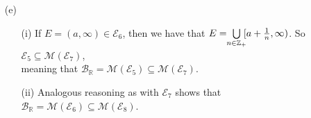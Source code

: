 \documentclass{book}
\newenvironment{myIndent}{%
   \begin{adjustwidth}{2.5em}{0em}%
}{%
   \end{adjustwidth}%
}
\newcommand{\retTwo}{\hfill\bigbreak}
\begin{document}
\begin{myIndent}
\begin{itemize}
\begin{itemize}
         So $\mathcal{E}_1 \subseteq \mathcal{M}(\mathcal{E}_5)$, meaning $\mathcal{B}_\mathbb{R} = \mathcal{M}(\mathcal{E}_1) \subseteq \mathcal{M}(\mathcal{E}_5)$.\retTwo

         \item[(ii)] Analogous reasoning to that with $\mathcal{E}_5$ shows that $\mathcal{B}_\mathbb{R} = \mathcal{M}(\mathcal{E}_1) \subseteq \mathcal{M}(\mathcal{E}_6)$.\retTwo
      \end{itemize}

      \item[(e)] \phantom{a}\\ [-10pt]
      \begin{itemize}
         \item[(i)] If $E = (a, \infty) \in \mathcal{E}_6$, then we have that $E = \hspace{-0.3em}\bigcup\limits_{n \in \mathbb{Z}_+}\hspace{-0.3em} [a + \frac{1}{n}, \infty)$. So $\mathcal{E}_5 \subseteq \mathcal{M}(\mathcal{E}_7)$,\\ [-10pt] meaning that $\mathcal{B}_\mathbb{R} = \mathcal{M}(\mathcal{E}_5) \subseteq \mathcal{M}(\mathcal{E}_7)$.\retTwo

         \item[(ii)] Analogous reasoning as with $\mathcal{E}_7$ shows that $\mathcal{B}_\mathbb{R} = \mathcal{M}(\mathcal{E}_6) \subseteq \mathcal{M}(\mathcal{E}_8)$.\newpage
      \end{itemize}
   \end{itemize}
\end{myIndent}
\end{document}
